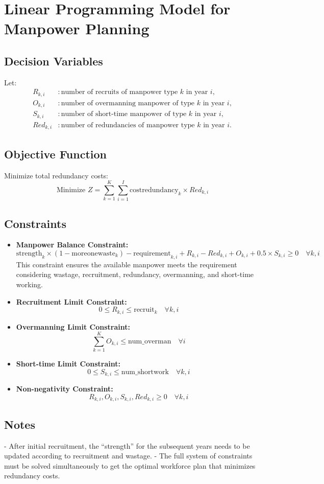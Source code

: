 \documentclass{article}
\begin{document}
\section*{Linear Programming Model for Manpower Planning}

\subsection*{Decision Variables}
Let:
\begin{align*}
R_{k,i} & : \text{number of recruits of manpower type } k \text{ in year } i, \\
O_{k,i} & : \text{number of overmanning manpower of type } k \text{ in year } i, \\
S_{k,i} & : \text{number of short-time manpower of type } k \text{ in year } i, \\
Red_{k,i} & : \text{number of redundancies of manpower type } k \text{ in year } i.
\end{align*}

\subsection*{Objective Function}
Minimize total redundancy costs:
\[
\text{Minimize } Z = \sum_{k=1}^{K} \sum_{i=1}^{I} \text{costredundancy}_{k} \times Red_{k,i}
\]

\subsection*{Constraints}
\begin{itemize}
    \item \textbf{Manpower Balance Constraint:}
    \[
    \text{strength}_{k} \times (1 - \text{moreonewaste}_{k}) - \text{requirement}_{k,i} + R_{k,i} - Red_{k,i} + O_{k,i} + 0.5 \times S_{k,i} \geq 0 \quad \forall k, i
    \]
    This constraint ensures the available manpower meets the requirement considering wastage, recruitment, redundancy, overmanning, and short-time working.

    \item \textbf{Recruitment Limit Constraint:}
    \[
    0 \leq R_{k,i} \leq \text{recruit}_{k} \quad \forall k, i
    \]

    \item \textbf{Overmanning Limit Constraint:}
    \[
    \sum_{k=1}^{K} O_{k,i} \leq \text{num\_overman} \quad \forall i
    \]

    \item \textbf{Short-time Limit Constraint:}
    \[
    0 \leq S_{k,i} \leq \text{num\_shortwork} \quad \forall k, i
    \]

    \item \textbf{Non-negativity Constraint:}
    \[
    R_{k,i}, O_{k,i}, S_{k,i}, Red_{k,i} \geq 0 \quad \forall k, i
    \]
\end{itemize}

\subsection*{Notes}
- After initial recruitment, the ``strength'' for the subsequent years needs to be updated according to recruitment and wastage.
- The full system of constraints must be solved simultaneously to get the optimal workforce plan that minimizes redundancy costs.
\end{document}
